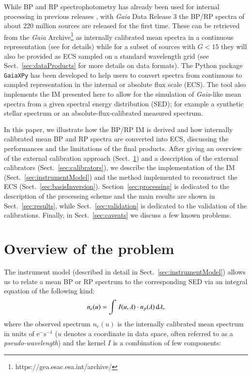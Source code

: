 \documentclass{aa}
\newcommand{\gdr}[1]{\gaia~DR#1\xspace}
\newcommand{\gaia}{\textit{Gaia}\xspace}
\newcommand{\xp}{BP and RP\xspace}
\newcommand{\xpor}{BP or RP\xspace}
\newcommand{\secname}{Sect.}
\newcommand{\secref}[1]{\secname~\ref{sec:#1}}
\newcommand{\asecref}[1]{Section~\ref{sec:#1}}
\begin{document}
While \xp spectrophotometry has already been used for internal processing in previous releases \citep{Riello2021}, with \gaia Data Release 3 \citep[\gdr3,][]{DR3-top-level} the BP/RP spectra of about 220 million sources are released for the first time. 
These can be retrieved from the \gaia Archive\footnote{https://gea.esac.esa.int/archive/} as internally calibrated mean spectra in a continuous representation (see \citet{DeAngeli2022} for details) while for a subset of sources with $G<15$  they will also be provided as ECS sampled on a standard wavelength grid (see \secref{dataProducts} for more details on data formats). 
The Python package  \texttt{GaiaXPy} \citep{DeAngeli2022b} has been developed to help users to convert spectra from continuous to sampled representation in the internal or absolute flux scale (ECS). The tool also implements the IM  presented here to allow for the simulation of \gaia-like mean spectra from a
given spectral energy distribution (SED); for example a synthetic stellar spectrum or an absolute-flux-calibrated measured spectrum.

In this paper, we illustrate how the BP/RP IM is derived and how internally calibrated mean \xp spectra are converted into ECS, discussing the performances and the limitations of the final products. After giving an overview of the external calibration approach (\secref{overview}) and a description of the external calibrators (\secref{calibrators}), 
we describe the implementation of the IM (\secref{instrumentModel}) and the method implemented to reconstruct the ECS (\secref{basisInversion}). \asecref{processing} is dedicated to the description of the processing scheme and the main results are shown in \secref{results}, while \secref{validation} is dedicated to the validation of the calibrations. Finally, in \secref{caveats} we discuss a few known problems. 

\section{Overview of the problem}\label{sec:overview}

The instrument model (described in detail in \secref{instrumentModel}) allows us to relate a mean \xpor spectrum to the corresponding SED via an integral equation of the following kind:
\begin{equation}
\label{eq:xpCompact}
n_e(u) = \int\, I(u,\lambda)\cdot n_p(\lambda) \, {\rm d}\lambda 
,\end{equation}
where the observed spectrum $n_e(u)$ is the internally calibrated mean spectrum in units of $\textrm{e}^- \textrm{s}^{-1}$ ($u$ denotes a coordinate in data space, often referred to as a \emph{pseudo-wavelength}) and the kernel $I$ is a combination of few components:
\end{document}
